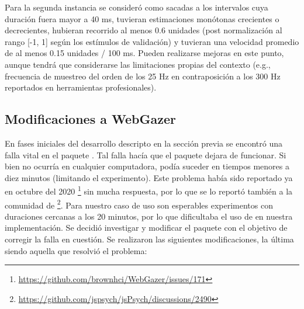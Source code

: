 Para la segunda instancia se consideró como sacadas a los intervalos cuya
duración fuera mayor a 40 ms, tuvieran estimaciones monótonas crecientes o
decrecientes, hubieran recorrido al menos 0.6 unidades (post normalización al
rango [-1, 1] según los estímulos de validación) y tuvieran una velocidad
promedio de al menos 0.15 unidades / 100 ms.
Pueden realizarse mejoras en este punto, aunque tendrá que considerarse las
limitaciones propias del contexto (e.g., frecuencia de muestreo del orden de
los 25 Hz en contraposición a los 300 Hz reportados en herramientas
profesionales).


\subsection{Modificaciones a WebGazer}

En fases iniciales del desarrollo descripto en la sección previa se encontró
una falla vital en el paquete \webgazer.
Tal falla hacía que el paquete dejara de funcionar.
Si bien no ocurría en cualquier computadora, podía suceder en tiempos menores a
diez minutos (limitando el experimento).
Este problema había sido reportado ya en octubre del 2020
\footnote{\url{https://github.com/brownhci/WebGazer/issues/171}} sin mucha
respuesta, por lo que se lo reportó también a la comunidad de \jspsych
\footnote{\url{https://github.com/jspsych/jsPsych/discussions/2490}}.
Para nuestro caso de uso son esperables experimentos con duraciones cercanas a
los 20 minutos, por lo que dificultaba el uso de \webgazer en nuestra
implementación.
Se decidió investigar y modificar el paquete con el objetivo de corregir la
falla en cuestión.
Se realizaron las siguientes modificaciones, la última siendo aquella que
resolvió el problema:
